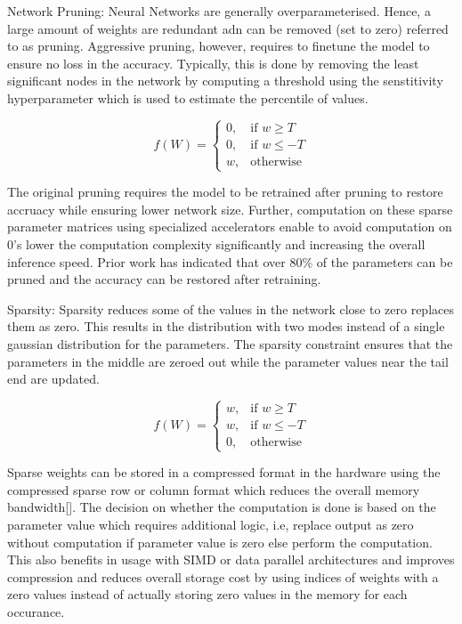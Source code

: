 Network Pruning: Neural Networks are generally overparameterised. Hence, a large amount of weights are redundant adn can be removed (set to zero) referred to as pruning.
Aggressive pruning, however, requires to finetune the model to ensure no loss in the accuracy. Typically, this is done by removing the least significant nodes in the network by computing a threshold using the senstitivity hyperparameter which is used to estimate the percentile of values.

\[
    f(W)=
\begin{cases}
    0, & \text{if } w\geq T\\
    0, & \text{if } w\leq -T\\
    w,  & \text{otherwise}
\end{cases}
\]

The original pruning requires the model to be retrained after pruning to restore accruacy while ensuring lower network size.
Further, computation on these sparse parameter matrices using specialized accelerators enable to avoid computation on 0's lower the computation complexity significantly and increasing the overall inference speed.
Prior work has indicated that over 80\% of the parameters can be pruned and the accuracy can be restored after retraining.

Sparsity: Sparsity reduces some of the values in the network close to zero replaces them as zero. This results in the distribution with two modes instead of a single gaussian distribution for the parameters.
The sparsity constraint ensures that the parameters in the middle are zeroed out while the parameter values near the tail end are updated.

\[
    f(W)=
\begin{cases}
    w, & \text{if } w\geq T\\
    w, & \text{if } w\leq -T\\
    0,  & \text{otherwise}
\end{cases}
\]

Sparse weights can be stored in a compressed format in the hardware using the compressed sparse row or column format which reduces the overall memory bandwidth[].
The decision on whether the computation is done is based on the parameter value which requires additional logic, i.e, replace output as zero without computation if parameter value is zero else perform the computation.
This also benefits in usage with SIMD or data parallel architectures and improves compression and reduces overall storage cost by using indices of weights with a zero values instead of actually storing zero values in the memory for each occurance.

